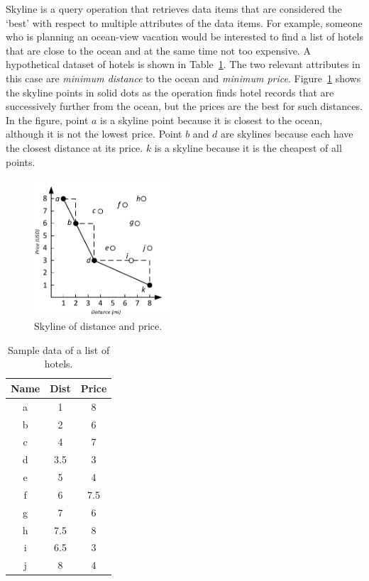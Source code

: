 \documentclass{sig-alternate}
\begin{document}
Skyline is a query operation that retrieves data items that are considered
the `best' with respect to multiple attributes of the data items.
For example, someone who is planning an ocean-view vacation would be
interested to find a list of hotels that are close to the ocean and at the
same time not too expensive. A hypothetical dataset of hotels is shown in
Table~\ref{tab:sample_data}. The two relevant attributes in this case are
\emph{minimum distance} to the ocean and \emph{minimum price}.
Figure~\ref{fig:skyline} shows the skyline points in solid dots as the
operation finds hotel records that are successively further from the ocean,
but the prices are the best for such distances.
In the figure, point $a$ is a skyline point because it is closest to the
ocean, although it is not the lowest price. Point $b$ and $d$ are skylines
because each have the closest distance at its price. $k$ is a skyline because
it is the cheapest of all points.


\begin{figure}[h]
\begin{center}
\includegraphics[width=2in]{Figures/skyline_points.pdf}
\caption{\small Skyline of distance and price.
\label{fig:skyline}}
\end{center}
\end{figure}

\begin{table}[!h]
\centering
\begin{tabular}{c|c|c}
  \hline
  {\bf Name} & {\bf Dist} & {\bf Price}\\
  \hline
  a & 1 & 8\\
  b & 2 & 6\\
  c & 4 & 7\\
  d & 3.5 & 3\\
  e & 5 & 4\\
  f & 6 & 7.5\\
  g & 7 & 6\\
  h & 7.5 & 8\\
  i & 6.5 & 3\\
  j & 8 & 4\\
  \hline
\end{tabular}
\caption{Sample data of a list of hotels.}
\label{tab:sample_data}
\end{table}
\end{document}
